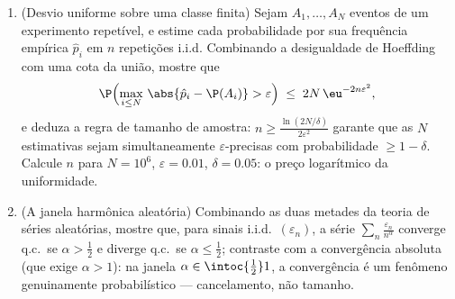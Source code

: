 \begin{problem}
\begin{enumerate}[resume]
  \item (Desvio uniforme sobre uma classe finita) Sejam $A_1,
        \dots, A_N$ eventos de
        um experimento repetível, e estime cada probabilidade por sua
        frequência empírica $\hat p_i$ em $n$ repetições i.i.d.
        Combinando a desigualdade de Hoeffding com uma cota da união,
        mostre que
        \[
        \P\Bigl(\max_{i\leq N}\,\abs{\hat p_i - \P(A_i)} >
        \varepsilon\Bigr) \;\leq\; 2N\,\eu^{-2n\varepsilon^2},
        \]
        e deduza a regra de tamanho de amostra: $n \geq
        \frac{\ln(2N/\delta)}{2\varepsilon^2}$ garante que as
        $N$ estimativas sejam simultaneamente $\varepsilon$-precisas com
        probabilidade $\geq 1 -
        \delta$. Calcule $n$ para $N = 10^6$, $\varepsilon =
        0.01$, $\delta = 0.05$: o
        preço logarítmico da uniformidade.
  \item (A janela harmônica aleatória) Combinando as duas metades da
        teoria de séries aleatórias, mostre que, para sinais i.i.d.\
        $(\varepsilon_n)$, a série $\sum_n\frac{\varepsilon_n}{n^\alpha}$ converge q.c.\ se $\alpha > \frac12$ e diverge q.c.\ se
        $\alpha \leq \frac12$; contraste com a convergência absoluta (que exige $\alpha > 1$):
        na janela $\alpha \in \intoc{\frac12}1$, a convergência é um fenômeno genuinamente
        probabilístico --- cancelamento, não tamanho.
\end{enumerate}
\end{problem}
